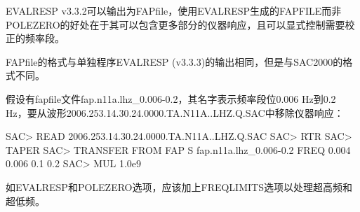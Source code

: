 EVALRESP v3.3.2可以输出为FAPfile，使用EVALRESP生成的FAPFILE而非POLEZERO的好处在于其可以包含更多部分的仪器响应，且可以显式控制需要校正的频率段。

FAPfile的格式与单独程序EVALRESP (v3.3.3)的输出相同，但是与SAC2000的格式不同。  


假设有fapfile文件fap.n11a.lhz\_0.006-0.2，其名字表示频率段位0.006 Hz到0.2 Hz，要从波形2006.253.14.30.24.0000.TA.N11A..LHZ.Q.SAC中移除仪器响应：
\begin{SACCode}
SAC> READ 2006.253.14.30.24.0000.TA.N11A..LHZ.Q.SAC
SAC> RTR
SAC> TAPER
SAC> TRANSFER FROM FAP S fap.n11a.lhz_0.006-0.2 FREQ 0.004 0.006 0.1 0.2
SAC> MUL 1.0e9
\end{SACCode}

如EVALRESP和POLEZERO选项，应该加上FREQLIMITS选项以处理超高频和超低频。

